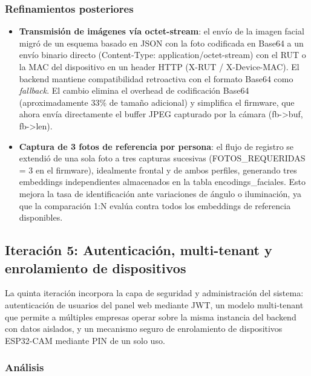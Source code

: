 \subsubsection{Refinamientos posteriores}

\begin{itemize}
    \item \textbf{Transmisión de imágenes vía octet-stream}: el envío de la imagen facial migró de un esquema basado en JSON con la foto codificada en Base64 a un envío binario directo (Content-Type: application/octet-stream) con el RUT o la MAC del dispositivo en un header HTTP (X-RUT / X-Device-MAC). El backend mantiene compatibilidad retroactiva con el formato Base64 como \textit{fallback}. El cambio elimina el overhead de codificación Base64 (aproximadamente 33\% de tamaño adicional) y simplifica el firmware, que ahora envía directamente el buffer JPEG capturado por la cámara (fb->buf, fb->len).

    \item \textbf{Captura de 3 fotos de referencia por persona}: el flujo de registro se extendió de una sola foto a tres capturas sucesivas (FOTOS\_REQUERIDAS = 3 en el firmware), idealmente frontal y de ambos perfiles, generando tres embeddings independientes almacenados en la tabla encodings\_faciales. Esto mejora la tasa de identificación ante variaciones de ángulo o iluminación, ya que la comparación 1:N evalúa contra todos los embeddings de referencia disponibles.
\end{itemize}



\subsection{Iteración 5: Autenticación, multi-tenant y enrolamiento de dispositivos}

La quinta iteración incorpora la capa de seguridad y administración del sistema: autenticación de usuarios del panel web mediante JWT, un modelo multi-tenant que permite a múltiples empresas operar sobre la misma instancia del backend con datos aislados, y un mecanismo seguro de enrolamiento de dispositivos ESP32-CAM mediante PIN de un solo uso.

\subsubsection{Análisis}

